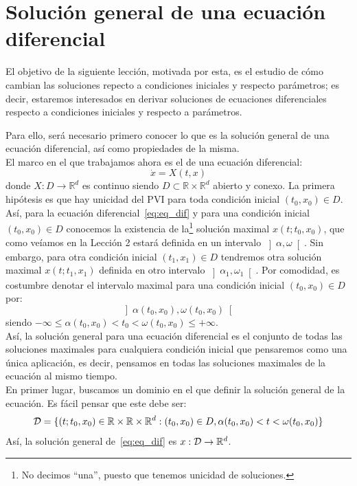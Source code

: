 \section{Solución general de una ecuación diferencial}
\noindent
El objetivo de la siguiente lección, motivada por esta, es el estudio de cómo cambian las soluciones repecto a condiciones iniciales y respecto parámetros; es decir, estaremos interesados en derivar soluciones de ecuaciones diferenciales respecto a condiciones iniciales y respecto a parámetros.

\noindent
Para ello, será necesario primero conocer lo que es la solución general de una ecuación diferencial, así como propiedades de la misma.\\

\noindent
El marco en el que trabajamos ahora es el de una ecuación diferencial:
\begin{equation}\label{eq:eq_dif}
    \dot{x} = X(t,x)
\end{equation}
donde $X:D\to \mathbb{R}^d$ es continuo siendo $D\subset \mathbb{R}\times\mathbb{R}^d$ abierto y conexo. La primera hipótesis es que hay unicidad del PVI para toda condición inicial $(t_0,x_0)\in D$.\\

\noindent
Así, para la ecuación diferencial~\eqref{eq:eq_dif} y para una condición inicial $(t_0,x_0)\in D$ conocemos la existencia de la\footnote{No decimos ``una'', puesto que tenemos unicidad de soluciones.} solución maximal $x(t;t_0,x_0)$, que como veíamos en la Lección 2 estará definida en un intervalo $\left]\alpha,\omega\right[$. Sin embargo, para otra condición inicial $(t_1,x_1)\in D$ tendremos otra solución maximal $x(t;t_1,x_1)$ definida en otro intervalo $\left]\alpha_1,\omega_1\right[$. Por comodidad, es costumbre denotar el intervalo maximal para una condición inicial $(t_0, x_0)\in D$ por:
\begin{equation*}
    \left]\alpha(t_0,x_0), \omega(t_0,x_0)\right[
\end{equation*}
siendo $-\infty \leq \alpha(t_0,x_0) < t_0 < \omega(t_0,x_0)\leq +\infty$.\\

\noindent
Así, la solución general para una ecuación diferencial es el conjunto de todas las soluciones maximales para cualquiera condición inicial que pensaremos como una única aplicación, es decir, pensamos en todas las soluciones maximales de la ecuación al mismo tiempo.\\

\noindent
En primer lugar, buscamos un dominio en el que definir la solución general de la ecuación. Es fácil pensar que este debe ser:
\begin{equation*}
    \mathcal{D} = \{(t;t_0,x_0)\in \mathbb{R}\times\mathbb{R}\times\mathbb{R}^d : (t_0,x_0)\in D, \alpha(t_0,x_0) < t < \omega(t_0,x_0)\}
\end{equation*}
Así, la solución general de~\eqref{eq:eq_dif} es $x:\mathcal{D}\to \mathbb{R}^d$.

